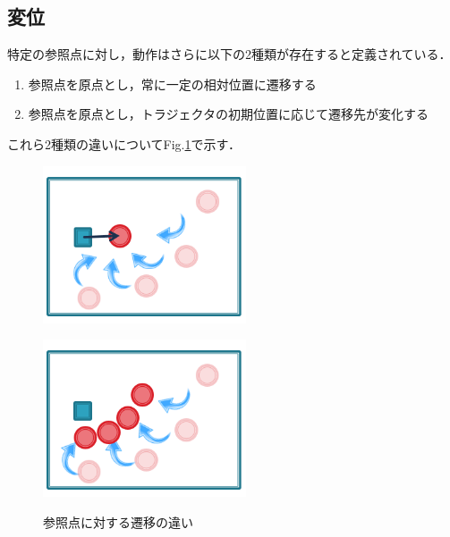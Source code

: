 \subsection{変位}

特定の参照点に対し，動作はさらに以下の2種類が存在すると定義されている．

	\begin{enumerate}
		\item 参照点を原点とし，常に一定の相対位置に遷移する
		\item 参照点を原点とし，トラジェクタの初期位置に応じて遷移先が変化する
	\end{enumerate}
これら2種類の違いについてFig.\ref{figure:2_difference_displacement}で示す．
\begin{figure}[h]
	\centering
	\begin{minipage}[t]{.4\textwidth}
		\centering
		\includegraphics[width=6cm]{figure2_2_sub_a.png} \\ %
		\label{subfigure:2_difference_displacement1}    
	\end{minipage}
	\begin{minipage}[t]{.4\textwidth}
		\centering
		\includegraphics[width=6cm]{figure2_2_sub_b.png} \\ %
		\label{subfigure:2_difference_displacement2}
	\end{minipage}
	\caption{参照点に対する遷移の違い}
	\label{figure:2_difference_displacement}
\end{figure}

